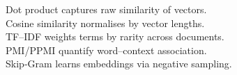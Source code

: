 \documentclass[preview]{standalone}
\begin{document}
Dot product captures raw similarity of vectors.\\Cosine similarity normalises by vector lengths.\\TF–IDF weights terms by rarity across documents.\\PMI/PPMI quantify word–context association.\\Skip‑Gram learns embeddings via negative sampling.\\
\end{document}
